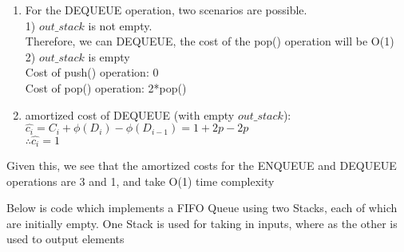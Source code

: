 \documentclass[11pt]{article}
\begin{document}
\begin{enumerate}
\begin{enumerate}
\begin{enumerate}
\begin{enumerate}
                \item For the DEQUEUE operation, two scenarios are possible. \\
                1) \hspace{0.5 cm} $out\_stack$ is not empty. \\Therefore, we can DEQUEUE, the cost of the pop() operation will be O(1)\\
                2) \hspace{0.5 cm} $out\_stack$ is empty\\
                Cost of push() operation: 0\\
                Cost of pop() operation: 2*pop()
                \item amortized cost of DEQUEUE (with empty $out\_stack$):\\
                $\hat{c_i} = C_i + \phi(D_i) - \phi(D_{i-1}) = 1 + 2p - 2p$ \\
                $\therefore \hat{c_i}= 1$
            \end{enumerate}
            Given this, we see that the amortized costs for the ENQUEUE and DEQUEUE operations are 3 and 1, and take O(1) time complexity
        \end{enumerate}

    
    \end{enumerate}

\pagebreak

Below is code which implements a FIFO Queue using two Stacks, each of which are initially empty. One Stack is used for taking in inputs, where as the other is used to output elements
    \inputminted[autogobble]{java}{Queue.java}
\pagebreak


\end{enumerate}
\end{document}

